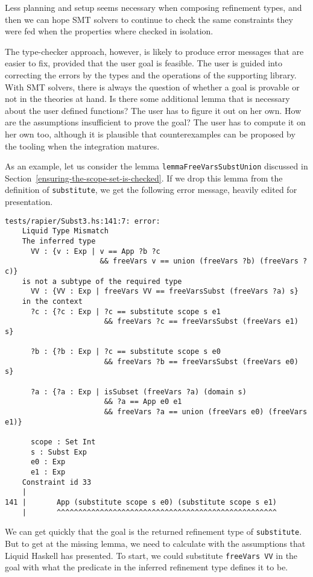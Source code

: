 \documentclass[acmtog, anonymous]{acmart}
\newcommand{\tc}[1]{{\small\texttt{#1}}}
\begin{document}
Less planning and setup seems necessary when composing refinement types, and
then we can hope SMT solvers to continue to check the same constraints
they were fed when the properties where checked in isolation.

The type-checker approach, however, is likely to produce error messages that
are easier to fix, provided that the user goal is feasible.
The user is guided into correcting the errors
by the types and the operations of the supporting library. With SMT solvers,
there is always the question of whether a goal is provable or not in the
theories at hand. Is there some additional lemma that is necessary about the user defined
functions? The user has to figure it out on her own. How are the assumptions
insufficient to prove the goal? The user has to compute it on her own too,
although it is plausible that counterexamples can be proposed by the
tooling when the integration matures.

As an example, let us consider the lemma \tc{lemma\-FreeVars\-Subst\-Union} discussed in
Section~\ref{ensuring-the-scope-set-is-checked}.
If we drop this lemma from the definition of \tc{substitute}, we get the following
error message, heavily edited for presentation.

\begin{verbatim}
tests/rapier/Subst3.hs:141:7: error:
    Liquid Type Mismatch
    The inferred type
      VV : {v : Exp | v == App ?b ?c
                      && freeVars v == union (freeVars ?b) (freeVars ?c)}
    is not a subtype of the required type
      VV : {VV : Exp | freeVars VV == freeVarsSubst (freeVars ?a) s}
    in the context
      ?c : {?c : Exp | ?c == substitute scope s e1
                       && freeVars ?c == freeVarsSubst (freeVars e1) s}

      ?b : {?b : Exp | ?c == substitute scope s e0
                       && freeVars ?b == freeVarsSubst (freeVars e0) s}

      ?a : {?a : Exp | isSubset (freeVars ?a) (domain s)
                       && ?a == App e0 e1
                       && freeVars ?a == union (freeVars e0) (freeVars e1)}

      scope : Set Int
      s : Subst Exp
      e0 : Exp
      e1 : Exp
    Constraint id 33
    |
141 |       App (substitute scope s e0) (substitute scope s e1)
    |       ^^^^^^^^^^^^^^^^^^^^^^^^^^^^^^^^^^^^^^^^^^^^^^^^^^^
\end{verbatim}

We can get quickly that the goal is the returned refinement type of \tc{substitute}.
But to get at the missing lemma, we need to calculate with the assumptions that
Liquid Haskell has presented.
To start, we could substitute \tc{freeVars VV} in the goal with what the predicate
in the inferred refinement type defines it to be.
\end{document}
